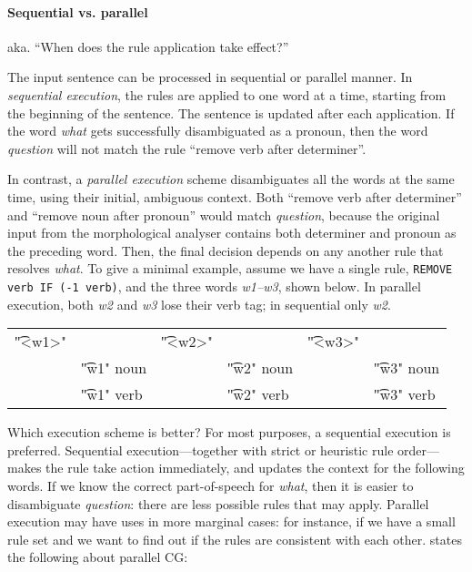 {\paragraph{Sequential vs. parallel}

aka. ``When does the rule application take effect?''

The input sentence can be processed in sequential or parallel manner.
In \emph{sequential execution}, the rules are applied to one word at a time, starting from the beginning of the sentence. The sentence is updated after each application. If the word \emph{what} gets successfully disambiguated as a pronoun, then the word \emph{question} will not match the rule ``remove verb after determiner''.


In contrast, a \emph{parallel execution} scheme disambiguates all the words at the same 
time, using their initial, ambiguous context. Both ``remove verb after determiner'' and 
``remove noun after pronoun'' would match \emph{question}, because the original 
input from the morphological analyser contains both determiner and pronoun as the 
preceding word. Then, the final decision depends on any another rule that resolves \emph{what}.
To give a minimal example, assume we have a single rule, \texttt{REMOVE verb IF (-1 verb)}, and the three words \emph{w1--w3}, shown below. 
In parallel execution, both \emph{w2} and \emph{w3} lose their verb tag; in sequential only \emph{w2}.



\begin{tabular}{p{0.5cm} l   p{0.5cm} l    p{0.5cm} l}
\t{"<w1>"}      &  & \t{"<w2>"}    & & \t{"<w3>"}      & \\
   & \t{"w1" noun} & & \t{"w2" noun} & & \t{"w3" noun}   \\
   & \t{"w1" verb} & & \t{"w2" verb} & & \t{"w3" verb} 

\end{tabular}


Which execution scheme is better? For most purposes, a sequential execution is preferred.  Sequential execution–--together with strict or heuristic rule order---makes the rule take action immediately, and updates the context for the following words. 
If we know the correct part-of-speech for \emph{what}, then it is easier to disambiguate \emph{question}: there are less possible rules that may apply. 
Parallel execution may have uses in more marginal cases: for instance, if we have a small rule set and we want to find out if the rules are consistent with each other.
\cite{koskenniemi90} states the following about parallel CG:

}
